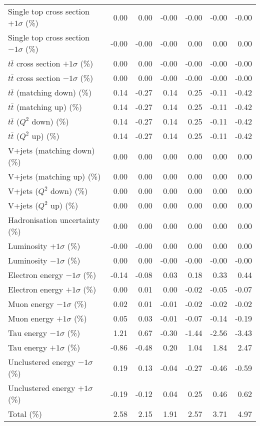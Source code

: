 \documentclass{article}
\begin{document}
\begin{table}[htbp]
{\begin{tabular}{lrrrrrr}
Single top cross section $+1\sigma$ (\%) & 0.00 & 0.00 & -0.00 & -0.00 & -0.00 & -0.00 \\ 
Single top cross section $-1\sigma$ (\%) & -0.00 & -0.00 & -0.00 & 0.00 & 0.00 & 0.00 \\ 
$t\bar{t}$ cross section $+1\sigma$ (\%) & 0.00 & 0.00 & -0.00 & -0.00 & -0.00 & -0.00 \\ 
$t\bar{t}$ cross section $-1\sigma$ (\%) & 0.00 & 0.00 & -0.00 & -0.00 & -0.00 & -0.00 \\ 
$t\bar{t}$ (matching down) (\%) & 0.14 & -0.27 & 0.14 & 0.25 & -0.11 & -0.42 \\ 
$t\bar{t}$ (matching up) (\%) & 0.14 & -0.27 & 0.14 & 0.25 & -0.11 & -0.42 \\ 
$t\bar{t}$ ($Q^{2}$ down) (\%) & 0.14 & -0.27 & 0.14 & 0.25 & -0.11 & -0.42 \\ 
$t\bar{t}$ ($Q^{2}$ up) (\%) & 0.14 & -0.27 & 0.14 & 0.25 & -0.11 & -0.42 \\ 
V+jets (matching down) (\%) & 0.00 & 0.00 & 0.00 & 0.00 & 0.00 & 0.00 \\ 
V+jets (matching up) (\%) & 0.00 & 0.00 & 0.00 & 0.00 & 0.00 & 0.00 \\ 
V+jets ($Q^{2}$ down) (\%) & 0.00 & 0.00 & 0.00 & 0.00 & 0.00 & 0.00 \\ 
V+jets ($Q^{2}$ up) (\%) & 0.00 & 0.00 & 0.00 & 0.00 & 0.00 & 0.00 \\ 
Hadronisation uncertainty (\%) & 0.00 & 0.00 & 0.00 & 0.00 & 0.00 & 0.00 \\ 
Luminosity $+1\sigma$ (\%) & -0.00 & -0.00 & 0.00 & 0.00 & 0.00 & 0.00 \\ 
Luminosity $-1\sigma$ (\%) & 0.00 & 0.00 & -0.00 & -0.00 & -0.00 & -0.00 \\ 
Electron energy $-1\sigma$ (\%) & -0.14 & -0.08 & 0.03 & 0.18 & 0.33 & 0.44 \\ 
Electron energy $+1\sigma$ (\%) & 0.00 & 0.01 & 0.00 & -0.02 & -0.05 & -0.07 \\ 
Muon energy $-1\sigma$ (\%) & 0.02 & 0.01 & -0.01 & -0.02 & -0.02 & -0.02 \\ 
Muon energy $+1\sigma$ (\%) & 0.05 & 0.03 & -0.01 & -0.07 & -0.14 & -0.19 \\ 
Tau energy $-1\sigma$ (\%) & 1.21 & 0.67 & -0.30 & -1.44 & -2.56 & -3.43 \\ 
Tau energy $+1\sigma$ (\%) & -0.86 & -0.48 & 0.20 & 1.04 & 1.84 & 2.47 \\ 
Unclustered energy $-1\sigma$ (\%) & 0.19 & 0.13 & -0.04 & -0.27 & -0.46 & -0.59 \\ 
Unclustered energy $+1\sigma$ (\%) & -0.19 & -0.12 & 0.04 & 0.25 & 0.46 & 0.62 \\ 
\hline 
Total (\%) & 2.58  & 2.15  & 1.91  & 2.57  & 3.71  & 4.97 \\ 
\hline 
\end{tabular}
}
\end{table}

\end{document}
